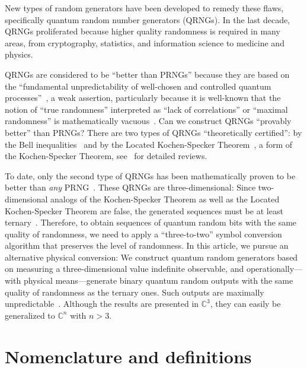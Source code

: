 \documentclass[%
 superscriptaddress,
  preprint,
 showpacs,
 showkeys,
 nofootinbib,
  amsmath,amssymb,
 pra,
  longbibliography,
  floatfix,
 ]{revtex4-2}
\theoremstyle{definition}
\begin{document}
New types of random generators have been developed to remedy these flaws, specifically quantum random number generators (QRNGs).
In the last decade, QRNGs proliferated because higher quality randomness is required in many areas, from cryptography,
statistics, and information science to medicine and physics.

QRNGs are considered to be ``better than PRNGs'' because they are based on the
``fundamental unpredictability of well-chosen and controlled quantum processes''~\cite{Quantis2020},
a weak assertion, particularly because it is well-known that the notion of ``true randomness''
interpreted as ``lack of correlations'' or ``maximal randomness'' is mathematically vacuous~\cite{calude:02}.
Can we construct QRNGs ``provably better'' than PRNGs? There are two types of QRNGs ``theoretically certified'':
by  the Bell inequalities~\cite{10.1038/nature09008,NonakaMyriam2022Tros,Hayashi:2022aa}
and by the Located Kochen-Specker Theorem~\cite{2012-incomput-proofsCJ,2015-AnalyticKS},
a form of the Kochen-Specker Theorem, see~\cite{kochen1,Landsman2020,cabello2021contextuality} for detailed reviews.

To date, only the second type of QRNGs has been mathematically proven to be better than \textit{any} PRNG~\cite{2012-incomput-proofsCJ,aguero_trejo_new_2021,RSPA23}.
These QRNGs are three-dimensional:
Since two-dimensional analogs of the Kochen-Specker Theorem as well as the Located Kochen-Specker Theorem are false,
the generated sequences must be at least ternary~\cite{svozil-2009-howto}.
Therefore, to obtain sequences of quantum random bits with the same quality of randomness, we need to apply a ``three-to-two'' symbol conversion algorithm that preserves the level of randomness.
In this article, we pursue an alternative physical conversion:
We construct quantum random generators based on measuring a three-dimensional value indefinite observable,
and operationally---with physical means---generate binary quantum random outputs with the same quality of randomness as the ternary ones.
Such outputs are maximally unpredictable~\cite{2014-nobit}.
Although the results are presented in $\mathbb{C}^3$, they can easily be generalized to $\mathbb{C}^n$ with $n>3$.




\section{Nomenclature and definitions}
\label{2023-viext-defs}
\end{document}
